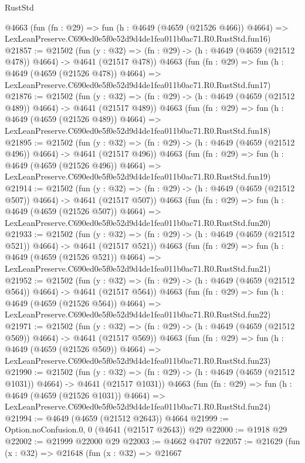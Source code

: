 \begin{lexlean}{RustStd}
\begin{coremodule}
    @4663
    (fun (fn : @29) =>
    fun (h : @4649 (@4659 (@21526 @466)) @4664) =>
    LexLeanPreserve.C690ed0e5f0e52d9d4de1fea011b0ac71.R0.RustStd.fun16)
@21857 := @21502
    (fun (y : @32) => (fn : @29) -> (h : @4649 (@4659 (@21512 @478)) @4664) -> @4641 (@21517 @478))
    @4663
    (fun (fn : @29) =>
    fun (h : @4649 (@4659 (@21526 @478)) @4664) =>
    LexLeanPreserve.C690ed0e5f0e52d9d4de1fea011b0ac71.R0.RustStd.fun17)
@21876 := @21502
    (fun (y : @32) => (fn : @29) -> (h : @4649 (@4659 (@21512 @489)) @4664) -> @4641 (@21517 @489))
    @4663
    (fun (fn : @29) =>
    fun (h : @4649 (@4659 (@21526 @489)) @4664) =>
    LexLeanPreserve.C690ed0e5f0e52d9d4de1fea011b0ac71.R0.RustStd.fun18)
@21895 := @21502
    (fun (y : @32) => (fn : @29) -> (h : @4649 (@4659 (@21512 @496)) @4664) -> @4641 (@21517 @496))
    @4663
    (fun (fn : @29) =>
    fun (h : @4649 (@4659 (@21526 @496)) @4664) =>
    LexLeanPreserve.C690ed0e5f0e52d9d4de1fea011b0ac71.R0.RustStd.fun19)
@21914 := @21502
    (fun (y : @32) => (fn : @29) -> (h : @4649 (@4659 (@21512 @507)) @4664) -> @4641 (@21517 @507))
    @4663
    (fun (fn : @29) =>
    fun (h : @4649 (@4659 (@21526 @507)) @4664) =>
    LexLeanPreserve.C690ed0e5f0e52d9d4de1fea011b0ac71.R0.RustStd.fun20)
@21933 := @21502
    (fun (y : @32) => (fn : @29) -> (h : @4649 (@4659 (@21512 @521)) @4664) -> @4641 (@21517 @521))
    @4663
    (fun (fn : @29) =>
    fun (h : @4649 (@4659 (@21526 @521)) @4664) =>
    LexLeanPreserve.C690ed0e5f0e52d9d4de1fea011b0ac71.R0.RustStd.fun21)
@21952 := @21502
    (fun (y : @32) => (fn : @29) -> (h : @4649 (@4659 (@21512 @564)) @4664) -> @4641 (@21517 @564))
    @4663
    (fun (fn : @29) =>
    fun (h : @4649 (@4659 (@21526 @564)) @4664) =>
    LexLeanPreserve.C690ed0e5f0e52d9d4de1fea011b0ac71.R0.RustStd.fun22)
@21971 := @21502
    (fun (y : @32) => (fn : @29) -> (h : @4649 (@4659 (@21512 @569)) @4664) -> @4641 (@21517 @569))
    @4663
    (fun (fn : @29) =>
    fun (h : @4649 (@4659 (@21526 @569)) @4664) =>
    LexLeanPreserve.C690ed0e5f0e52d9d4de1fea011b0ac71.R0.RustStd.fun23)
@21990 := @21502
    (fun (y : @32) =>
    (fn : @29) -> (h : @4649 (@4659 (@21512 @1031)) @4664) -> @4641 (@21517 @1031))
    @4663
    (fun (fn : @29) =>
    fun (h : @4649 (@4659 (@21526 @1031)) @4664) =>
    LexLeanPreserve.C690ed0e5f0e52d9d4de1fea011b0ac71.R0.RustStd.fun24)
@21994 := @4649 (@4659 (@21512 @2643)) @4664
@21999 := Option.noConfusion.{0, 0} (@4641 (@21517 @2643)) @29
@22000 := @1918 @29
@22002 := @21999 @22000 @29
@22003 := @4662 @4707
@22057 := @21629
    (fun (x : @32) =>
    @21648
      (fun (x : @32) =>
      @21667

\end{coremodule}
\end{lexlean}
